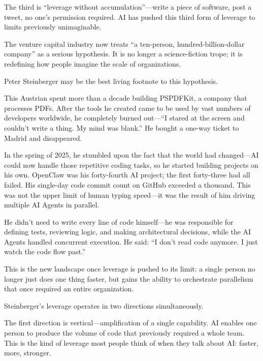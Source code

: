 The third is ``leverage without accumulation''---write a piece of software, post a tweet, no one's permission required. AI has pushed this third form of leverage to limits previously unimaginable.

\vspace{1em}

The venture capital industry now treats ``a ten-person, hundred-billion-dollar company'' as a serious hypothesis. It is no longer a science-fiction trope; it is redefining how people imagine the scale of organizations.

\vspace{1em}

Peter Steinberger may be the best living footnote to this hypothesis.

This Austrian spent more than a decade building PSPDFKit, a company that processes PDFs. After the tools he created came to be used by vast numbers of developers worldwide, he completely burned out---``I stared at the screen and couldn't write a thing. My mind was blank.'' He bought a one-way ticket to Madrid and disappeared.

\vspace{1em}

In the spring of 2025, he stumbled upon the fact that the world had changed---AI could now handle those repetitive coding tasks, so he started building projects on his own. OpenClaw was his forty-fourth AI project; the first forty-three had all failed.
His single-day code commit count on GitHub exceeded a thousand. This was not the upper limit of human typing speed---it was the result of him driving multiple AI Agents in parallel.

He didn't need to write every line of code himself---he was responsible for defining tests, reviewing logic, and making architectural decisions, while the AI Agents handled concurrent execution. He said: ``I don't read code anymore. I just watch the code flow past.''

This is the new landscape once leverage is pushed to its limit: a single person no longer just does one thing faster, but gains the ability to orchestrate parallelism that once required an entire organization.

\vspace{1em}

Steinberger's leverage operates in two directions simultaneously.

The first direction is vertical---amplification of a single capability. AI enables one person to produce the volume of code that previously required a whole team. This is the kind of leverage most people think of when they talk about AI: faster, more, stronger.

